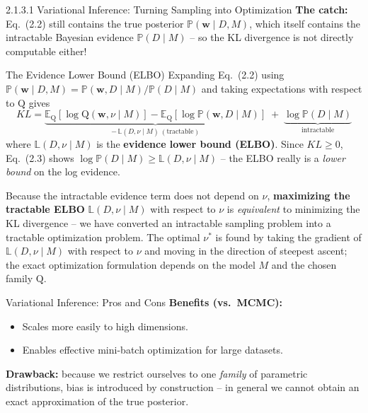 \documentclass[aspectratio=169,10pt]{beamer}
\begin{document}
\begin{frame}[allowframebreaks]{2.1.3.1 Variational Inference: Turning Sampling into Optimization}
  \textbf{The catch:} Eq.~(2.2) still contains the true posterior
  $\mathbb{P}(\mathbf{w}\mid D,M)$, which itself contains the intractable
  Bayesian evidence $\mathbb{P}(D\mid M)$ -- so the KL divergence is not
  directly computable either!

  \framebreak

  \begin{block}{The Evidence Lower Bound (ELBO)}
    Expanding Eq.~(2.2) using $\mathbb{P}(\mathbf{w}\mid D,M) =
    \mathbb{P}(\mathbf{w},D\mid M)/\mathbb{P}(D\mid M)$ and taking
    expectations with respect to $\text{Q}$ gives
    \[
      KL = \underbrace{\mathbb{E}_{\text{Q}}[\log \text{Q}(\mathbf{w},\nu\mid M)]
             - \mathbb{E}_{\text{Q}}[\log \mathbb{P}(\mathbf{w},D\mid M)]}_{-\,\mathbb{L}(D,\nu\mid M)\ (\text{tractable})}
      \;+\; \underbrace{\log \mathbb{P}(D\mid M)}_{\text{intractable}}
      \tag{2.3}
    \]
    where $\mathbb{L}(D,\nu\mid M)$ is the \textbf{evidence lower bound
    (ELBO)}. Since $KL \ge 0$, Eq.~(2.3) shows
    $\log\mathbb{P}(D\mid M) \ge \mathbb{L}(D,\nu\mid M)$ -- the ELBO really
    is a \emph{lower bound} on the log evidence.
  \end{block}

  Because the intractable evidence term does not depend on $\nu$,
  \textbf{maximizing the tractable ELBO} $\mathbb{L}(D,\nu\mid M)$ with
  respect to $\nu$ is \emph{equivalent} to minimizing the KL divergence --
  we have converted an intractable sampling problem into a tractable
  optimization problem. The optimal $\nu^*$ is found by taking the gradient
  of $\mathbb{L}(D,\nu\mid M)$ with respect to $\nu$ and moving in the
  direction of steepest ascent; the exact optimization formulation depends
  on the model $M$ and the chosen family $\text{Q}$.

  \framebreak

  \begin{block}{Variational Inference: Pros and Cons}
    \textbf{Benefits (vs.\ MCMC):}
    \begin{itemize}
      \item Scales more easily to high dimensions.
      \item Enables effective mini-batch optimization for large datasets.
    \end{itemize}
    \textbf{Drawback:} because we restrict ourselves to one \emph{family} of
    parametric distributions, bias is introduced by construction -- in
    general we cannot obtain an exact approximation of the true posterior.
  \end{block}
\end{frame}
\end{document}
